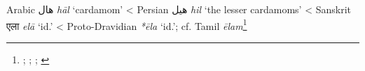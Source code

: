\begin{etymology}\label{ety:hal}
Arabic {هال} \textit{hāl} `cardamom'
< Persian {هیل} \textit{hil} `the lesser cardamoms'
< Sanskrit {एला} \textit{elā} `id.'
< Proto-Dravidian \textit{*ēla} `id.'; cf. Tamil \textit{ēlam}\footnote{\textcite[1223]{wehr_dictionary_1976}; \textcite[1521]{steingass_comprehensive_1892}; \textcite[104]{dalby_dangerous_2000}; \textcite[87]{burrow_dravidian_1984}}
\end{etymology}